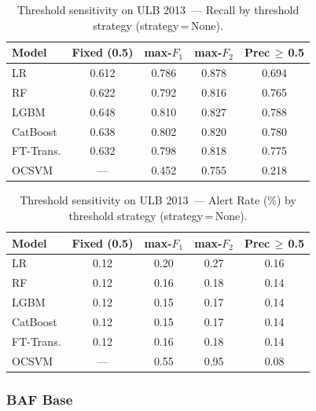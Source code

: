 \begin{table}[ht]
\centering
\caption{Threshold sensitivity on ULB 2013~--- Recall by threshold strategy (strategy\,=\,None).}
\label{tab:threshold_ulb_recall}
\begin{tabular}{l c c c c}
\toprule
Model & Fixed (0.5) & max-$F_1$ & max-$F_2$ & Prec\,$\geq$\,0.5 \\
\midrule
LR        & 0.612 & 0.786 & 0.878 & 0.694 \\
RF        & 0.622 & 0.792 & 0.816 & 0.765 \\
LGBM      & 0.648 & 0.810 & 0.827 & 0.788 \\
CatBoost  & 0.638 & 0.802 & 0.820 & 0.780 \\
FT-Trans. & 0.632 & 0.798 & 0.818 & 0.775 \\
OCSVM     & ---   & 0.452 & 0.755 & 0.218 \\
\bottomrule
\end{tabular}
\end{table}

\begin{table}[ht]
\centering
\caption{Threshold sensitivity on ULB 2013~--- Alert Rate (\%) by threshold strategy (strategy\,=\,None).}
\label{tab:threshold_ulb_alert}
\begin{tabular}{l c c c c}
\toprule
Model & Fixed (0.5) & max-$F_1$ & max-$F_2$ & Prec\,$\geq$\,0.5 \\
\midrule
LR        & 0.12 & 0.20 & 0.27 & 0.16 \\
RF        & 0.12 & 0.16 & 0.18 & 0.14 \\
LGBM      & 0.12 & 0.15 & 0.17 & 0.14 \\
CatBoost  & 0.12 & 0.15 & 0.17 & 0.14 \\
FT-Trans. & 0.12 & 0.16 & 0.18 & 0.14 \\
OCSVM     & ---  & 0.55 & 0.95 & 0.08 \\
\bottomrule
\end{tabular}
\end{table}


\subsubsection{BAF Base}

